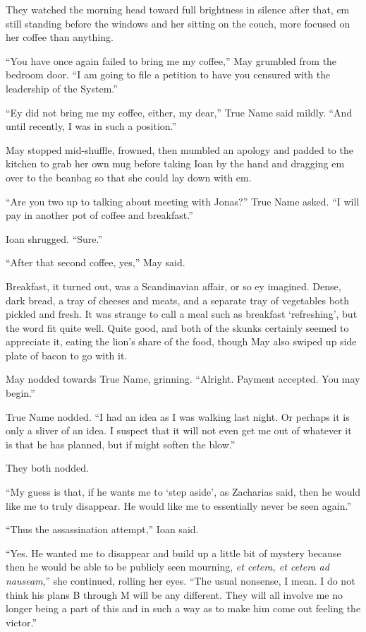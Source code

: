 They watched the morning head toward full brightness in silence after that, em still standing before the windows and her sitting on the couch, more focused on her coffee than anything.

``You have once again failed to bring me my coffee,'' May grumbled from the bedroom door. ``I am going to file a petition to have you censured with the leadership of the System.''

``Ey did not bring me my coffee, either, my dear,'' True Name said mildly. ``And until recently, I was in such a position.''

May stopped mid-shuffle, frowned, then mumbled an apology and padded to the kitchen to grab her own mug before taking Ioan by the hand and dragging em over to the beanbag so that she could lay down with em.

``Are you two up to talking about meeting with Jonas?'' True Name asked. ``I will pay in another pot of coffee and breakfast.''

Ioan shrugged. ``Sure.''

``After that second coffee, yes,'' May said.

Breakfast, it turned out, was a Scandinavian affair, or so ey imagined. Dense, dark bread, a tray of cheeses and meats, and a separate tray of vegetables both pickled and fresh. It was strange to call a meal such as breakfast `refreshing', but the word fit quite well. Quite good, and both of the skunks certainly seemed to appreciate it, eating the lion's share of the food, though May also swiped up side plate of bacon to go with it.

May nodded towards True Name, grinning. ``Alright. Payment accepted. You may begin.''

True Name nodded. ``I had an idea as I was walking last night. Or perhaps it is only a sliver of an idea. I suspect that it will not even get me out of whatever it is that he has planned, but if might soften the blow.''

They both nodded.

``My guess is that, if he wants me to `step aside', as Zacharias said, then he would like me to truly disappear. He would like me to essentially never be seen again.''

``Thus the assassination attempt,'' Ioan said.

``Yes. He wanted me to disappear and build up a little bit of mystery because then he would be able to be publicly seen mourning, \emph{et cetera, et cetera ad nauseam},'' she continued, rolling her eyes. ``The usual nonsense, I mean. I do not think his plans B through M will be any different. They will all involve me no longer being a part of this and in such a way as to make him come out feeling the victor.''

